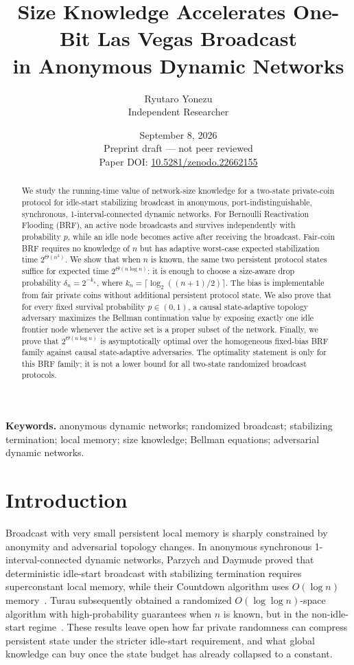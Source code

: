 \documentclass[11pt]{article}
\title{\textbf{Size Knowledge Accelerates One-Bit Las Vegas Broadcast\\
in Anonymous Dynamic Networks}}
\author{Ryutaro Yonezu\\Independent Researcher}
\date{September 8, 2026\\\small Preprint draft --- not peer reviewed\\\small Paper DOI: \href{https://doi.org/10.5281/zenodo.22662155}{10.5281/zenodo.22662155}}
\begin{document}
\maketitle

\begin{abstract}
We study the running-time value of network-size knowledge for a two-state
private-coin protocol for idle-start stabilizing broadcast in anonymous,
port-indistinguishable, synchronous, 1-interval-connected dynamic networks.
For Bernoulli Reactivation Flooding (BRF), an active node broadcasts and
survives independently with probability $p$, while an idle node becomes active
after receiving the broadcast.  Fair-coin BRF requires no knowledge of $n$ but
has adaptive worst-case expected stabilization time $2^{\Theta(n^2)}$.
We show that when $n$ is known, the same two persistent protocol states suffice
for expected time $2^{\Theta(n\log n)}$: it is enough to choose a size-aware
drop probability $\delta_n=2^{-k_n}$, where
$k_n=\lceil \log_2((n+1)/2)\rceil$.  The bias is implementable from fair private
coins without additional persistent protocol state.  We also prove that for
every fixed survival probability $p\in(0,1)$, a causal state-adaptive topology
adversary maximizes the Bellman continuation value by exposing exactly one idle
frontier node whenever the active set is a proper subset of the network.
Finally, we prove that $2^{\Theta(n\log n)}$ is asymptotically optimal over the
homogeneous fixed-bias BRF family against causal state-adaptive adversaries.
The optimality statement is only for this BRF family; it is not a lower bound
for all two-state randomized broadcast protocols.
\end{abstract}

\noindent\textbf{Keywords.} anonymous dynamic networks; randomized broadcast; stabilizing termination; local memory; size knowledge; Bellman equations; adversarial dynamic networks.

\section{Introduction}
Broadcast with very small persistent local memory is sharply constrained by anonymity and adversarial topology changes.  In anonymous synchronous 1-interval-connected dynamic networks, Parzych and Daymude proved that deterministic idle-start broadcast with stabilizing termination requires superconstant local memory, while their Countdown algorithm uses $O(\log n)$ memory~\cite{parzych2024}.  Turau subsequently obtained a randomized $O(\log\log n)$-space algorithm with high-probability guarantees when $n$ is known, but in the non-idle-start regime~\cite{turau2026}.  These results leave open how far private randomness can compress persistent state under the stricter idle-start requirement, and what global knowledge can buy once the state budget has already collapsed to a constant.
\end{document}
